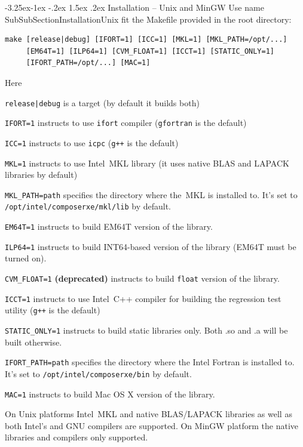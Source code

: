 \documentclass[12pt,letterpaper]{article}
\makeatletter
\renewcommand\subsubsection{\@startsection{subsubsection}{3}{0mm}%
                                     {-3.25ex\@plus -1ex \@minus -.2ex}%
                                     {1.5ex \@plus .2ex}%
                                     {\normalfont\normalsize\bfseries\sffamily}}
\makeatother
\begin{document}



\subsubsection{Installation -- Unix and MinGW}
Use%
\pdfdest name {SubSubSectionInstallationUnix} fit{}
the Makefile provided in the root directory:
\begin{Verbatim}
make [release|debug] [IFORT=1] [ICC=1] [MKL=1] [MKL_PATH=/opt/...] 
     [EM64T=1] [ILP64=1] [CVM_FLOAT=1] [ICCT=1] [STATIC_ONLY=1]
     [IFORT_PATH=/opt/...] [MAC=1]
\end{Verbatim}
Here
\begin{compactitem}
\item \verb'release|debug' is a target (by default it builds both)
\item \verb'IFORT=1' instructs to use \verb"ifort"
compiler (\verb'gfortran' is the default)
\item \verb'ICC=1' instructs to use \verb"icpc"
(\verb'g++' is the default)
\item \verb'MKL=1' instructs to use Intel~MKL library (it uses
  native BLAS and LAPACK libraries by default)
\item \verb'MKL_PATH=path' specifies the directory where the~MKL is installed to.
It's set to \verb'/opt/intel/composerxe/mkl/lib' by default.
\item \verb'EM64T=1' instructs to build EM64T version of the library.
\item \verb'ILP64=1' instructs to build INT64-based version of the library (EM64T must be turned on).
\item \verb'CVM_FLOAT=1' \textbf{(deprecated)} instructs to build \verb'float' version of the library.
\item \verb'ICCT=1' instructs to use Intel~C++ compiler for building the
regression test utility (\verb'g++' is the default)
\item \verb'STATIC_ONLY=1' instructs to build static libraries only.
Both .so and .a will be built otherwise.
\item \verb'IFORT_PATH=path' specifies the directory where the Intel Fortran is installed to. 
It's set to \verb"/opt/intel/composerxe/bin" by default.
\item \verb'MAC=1' instructs to build Mac OS X version of the library.
\end{compactitem}
On Unix platforms Intel~MKL and native BLAS/LAPACK libraries as well
as both Intel's and GNU compilers are supported. On MinGW platform the native libraries and
compilers only supported.
\end{document}
